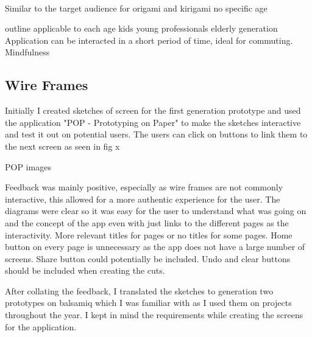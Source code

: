 \documentclass[11pt]{article}
\begin{document}
            \paragraph{}
            Similar to the target audience for origami and kirigami
            no specific age
            
            outline applicable to each age
            kids
            young professionals 
            elderly generation 
            Application can be interacted in a short period of time, ideal for commuting. Mindfulness 
            

    \subsection{Wire Frames}
    Initially I created sketches of screen for the first generation prototype and used the application "POP - Prototyping on Paper" to make the sketches interactive and test it out on potential users. The users can click on buttons to link them  to the next screen as seen in fig x %
    
        POP images

    Feedback was mainly positive, especially as wire frames are not commonly interactive, this allowed for a more authentic experience for the user. The diagrams were clear so it was easy for the user to understand what was going on and the concept of the app even with just links to the different pages as the interactivity.
    More relevant titles for pages or no titles for some pages. Home button on every page is unnecessary as the app does not have a large number of screens. Share button could potentially be included. Undo and clear buttons should be included when creating the cuts. 
    
    
    After collating the feedback, I translated the sketches to generation two prototypes on balsamiq which I was familiar with as I used them on projects throughout the year. %
    I kept in mind the requirements while creating the screens for the application.
    
\end{document}

